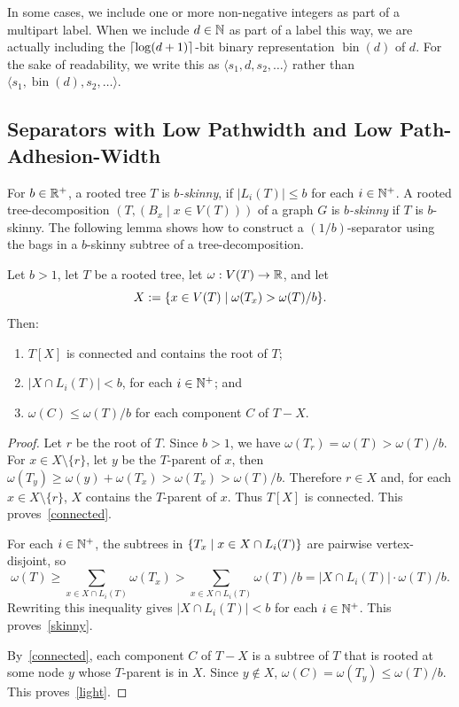 \documentclass{patmorin}
\renewcommand{\ge}{\geqslant}
\renewcommand{\le}{\leqslant}
\newcommand{\defin}[1]{\emph{\textcolor{brightmaroon}{#1}}}
\DeclareMathOperator{\bin}{bin}
\DeclarePairedDelimiter{\set}{\{}{\}}
\DeclarePairedDelimiter{\ceil}{\lceil}{\rceil}
\begin{document}
  In some cases, we include one or more non-negative integers as part of a multipart label.  When we include $d\in\mathbb{N}$ as part of a label this way, we are actually including the $\ceil{\log(d+1)}$-bit binary representation \defin{$\bin(d)$} of $d$.  For the sake of readability, we write this as $\langle s_1,d,s_2,\ldots\rangle$ rather than $\langle s_1,\bin(d),s_2,\ldots\rangle$. \label{bin_d}

  \subsection{Separators with Low Pathwidth and Low Path-Adhesion-Width}

  For $b\in\mathbb{R}^+$,
  a rooted tree $T$ is \defin{$b$-skinny},
  if $|L_i(T)|\le b$ for each $i\in\mathbb{N}^+$.  A rooted tree-decomposition $(T,(B_x\mid x\in V(T)))$ of a graph $G$ is \defin{$b$-skinny} if $T$ is $b$-skinny.  The following lemma shows how to construct a $(1/b)$-separator using the bags in a $b$-skinny subtree of a tree-decomposition.


  \begin{lem}\label{low_pathwidth_separator}
    Let $b>1$, let $T$ be a rooted tree, let $\omega:V(T)\to\mathbb{R}$, and let
    \[
    X:=\set{x\in V(T)\mid\omega(T_x)>\omega(T)/b}.
    \]
    Then:
    \begin{enumerate}[nosep,nolistsep,label=(\alph*)]
      \item\label{connected} $T[X]$ is connected and contains the root of $T$;
      \item\label{skinny} $|X\cap L_i(T)|< b$, for each $i\in\mathbb{N}^+$; and
      \item\label{light} $\omega(C)\le \omega(T)/b$ for each component $C$ of $T-X$.
    \end{enumerate}
  \end{lem}

  \begin{proof}
    Let $r$ be the root of $T$.  Since $b>1$, we have $\omega(T_r)=\omega(T)>\omega(T)/b$. %
    For $x\in X\setminus\{r\}$, let $y$ be the $T$-parent of $x$, then
    $\omega(T_y)\ge \omega(y)+\omega(T_x)>\omega(T_x)>\omega(T)/b$.
    Therefore $r\in X$ and, for each $x\in X\setminus\{r\}$, $X$ contains the $T$-parent of $x$. Thus $T[X]$ is connected.
    This proves~\ref{connected}.

    For each $i\in\mathbb{N}^+$, the subtrees in $\set{T_x \mid x\in X\cap L_i(T)}$ are pairwise vertex-disjoint, so
    \[
    \omega(T) \ge \sum_{x\in X\cap L_i(T)} \omega(T_x)> \sum_{x\in X\cap L_i(T)}\omega(T)/b = |X\cap L_i(T)|\cdot\omega(T)/b.
    \]
    Rewriting this inequality gives $|X\cap L_i(T)|<b$ for each $i\in\mathbb{N}^+$.
    This proves~\ref{skinny}.

    By~\ref{connected}, each component $C$ of $T-X$ is a subtree of $T$ that is rooted at some node $y$ whose $T$-parent is in $X$.  Since  $y\not\in X$, $\omega(C)=\omega(T_y)\le \omega(T)/b$.
    This proves~\ref{light}.
  \end{proof}
\end{document}
